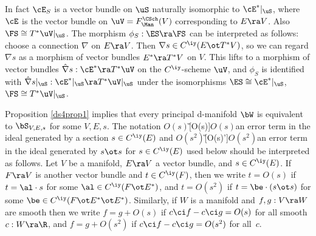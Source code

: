 \documentclass{article}
\begin{document}
\begin{ex}
In fact $\cE_S$ is a vector bundle on $\uS$ naturally isomorphic to
$\cE^*\vert_\uS$, where $\cE$ is the vector bundle on
$\uV=F_\Man^\CSch(V)$ corresponding to $E\ra V$. Also $\FS\cong
T^*\uV\vert_\uS$. The morphism $\phi_S:\ES\ra\FS$ can be interpreted
as follows: choose a connection $\nabla$ on $E\ra V$. Then $\nabla
s\in C^\iy(E\ot T^*V)$, so we can regard $\nabla s$ as a morphism of
vector bundles $E^*\ra T^*V$ on $V$. This lifts to a morphism of
vector bundles $\hat\nabla s:\cE^*\ra T^*\uV$ on the $C^\iy$-scheme
$\uV$, and $\phi_S$ is identified with $\hat\nabla
s\vert_\uS:\cE^*\vert_\uS\ra T^*\uV\vert_\uS$ under the isomorphisms
$\ES\cong\cE^*\vert_\uS$, $\FS\cong T^*\uV\vert_\uS$.
\label{ds4ex2}
\end{ex}

Proposition \ref{ds4prop1} implies that every principal d-manifold
$\bW$ is equivalent to $\bS_{V,E,s}$ for some $V,E,s$. The notation
$O(s)$\G[O(s)]{$O(s)$}{an error term in the ideal generated by a
section $s\in C^\iy(E)$} and $O(s^2)$\G[O(s)']{$O(s^2)$}{an error
term in the ideal generated by $s\ot s$ for $s\in C^\iy(E)$} used
below should be interpreted as follows. Let $V$ be a manifold, $E\ra
V$ a vector bundle, and $s\in C^\iy(E)$. If $F\ra V$ is another
vector bundle and $t\in C^\iy(F)$, then we write $t=O(s)$ if
$t=\al\cdot s$ for some $\al\in C^\iy(F\ot E^*)$, and $t=O(s^2)$ if
$t=\be\cdot (s\ot s)$ for some $\be\in C^\iy(F\ot E^*\ot E^*)$.
Similarly, if $W$ is a manifold and $f,g:V\ra W$ are smooth then we
write $f=g+O(s)$ if $c\ci f-c\ci g=O(s)$ for all smooth $c:W\ra\R$,
and $f=g+O(s^2)$ if $c\ci f-c\ci g=O(s^2)$ for all~$c$.
\end{document}

